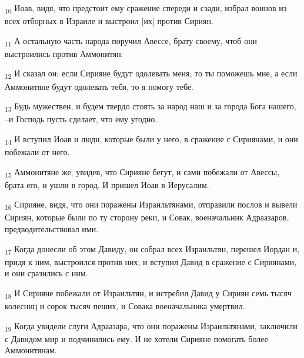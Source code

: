 \begin{tcolorbox}
\textsubscript{10} Иоав, видя, что предстоит ему сражение спереди и сзади, избрал воинов из всех отборных в Израиле и выстроил [их] против Сириян.
\end{tcolorbox}
\begin{tcolorbox}
\textsubscript{11} А остальную часть народа поручил Авессе, брату своему, чтоб они выстроились против Аммонитян.
\end{tcolorbox}
\begin{tcolorbox}
\textsubscript{12} И сказал он: если Сирияне будут одолевать меня, то ты поможешь мне, а если Аммонитяне будут одолевать тебя, то я помогу тебе.
\end{tcolorbox}
\begin{tcolorbox}
\textsubscript{13} Будь мужествен, и будем твердо стоять за народ наш и за города Бога нашего, --и Господь пусть сделает, что ему угодно.
\end{tcolorbox}
\begin{tcolorbox}
\textsubscript{14} И вступил Иоав и люди, которые были у него, в сражение с Сириянами, и они побежали от него.
\end{tcolorbox}
\begin{tcolorbox}
\textsubscript{15} Аммонитяне же, увидев, что Сирияне бегут, и сами побежали от Авессы, брата его, и ушли в город. И пришел Иоав в Иерусалим.
\end{tcolorbox}
\begin{tcolorbox}
\textsubscript{16} Сирияне, видя, что они поражены Израильтянами, отправили послов и вывели Сириян, которые были по ту сторону реки, и Совак, военачальник Адраазаров, предводительствовал ими.
\end{tcolorbox}
\begin{tcolorbox}
\textsubscript{17} Когда донесли об этом Давиду, он собрал всех Израильтян, перешел Иордан и, придя к ним, выстроился против них; и вступил Давид в сражение с Сириянами, и они сразились с ним.
\end{tcolorbox}
\begin{tcolorbox}
\textsubscript{18} И Сирияне побежали от Израильтян, и истребил Давид у Сириян семь тысяч колесниц и сорок тысяч пеших, и Совака военачальника умертвил.
\end{tcolorbox}
\begin{tcolorbox}
\textsubscript{19} Когда увидели слуги Адраазара, что они поражены Израильтянами, заключили с Давидом мир и подчинились ему. И не хотели Сирияне помогать более Аммонитянам.
\end{tcolorbox}

